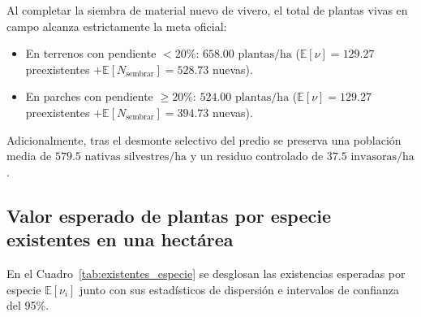 \documentclass[11pt,a4paper]{article}
\begin{document}
Al completar la siembra de material nuevo de vivero, el total de plantas vivas en campo alcanza estrictamente la meta oficial:
\begin{itemize}[leftmargin=1.5em]
    \item En terrenos con pendiente $< 20\%$: \textbf{$658.00\text{ plantas/ha}$} ($\mathbb{E}[\nu] = 129.27$ preexistentes $+ \mathbb{E}[N_{\text{sembrar}}] = 528.73$ nuevas).
    \item En parches con pendiente $\ge 20\%$: \textbf{$524.00\text{ plantas/ha}$} ($\mathbb{E}[\nu] = 129.27$ preexistentes $+ \mathbb{E}[N_{\text{sembrar}}] = 394.73$ nuevas).
\end{itemize}
Adicionalmente, tras el desmonte selectivo del predio se preserva una población media de \textbf{$579.5\text{ nativas silvestres/ha}$} y un residuo controlado de \textbf{$37.5\text{ invasoras/ha}$}.

\subsection{Valor esperado de plantas por especie existentes en una hectárea}
En el Cuadro~\ref{tab:existentes_especie} se desglosan las existencias esperadas por especie $\mathbb{E}[\nu_i]$ junto con sus estadísticos de dispersión e intervalos de confianza del 95\%.
\end{document}
